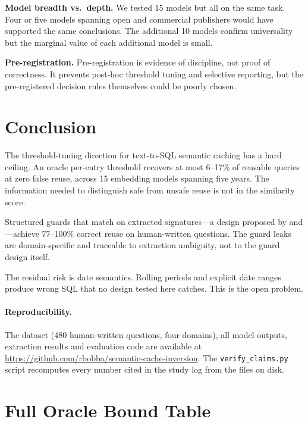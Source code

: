 \documentclass[11pt,a4paper]{article}
\begin{document}
\textbf{Model breadth vs.\ depth.} We tested 15 models but all on the
same task. Four or five models spanning open and commercial publishers
would have supported the same conclusions. The additional 10 models
confirm universality but the marginal value of each additional model is
small.

\textbf{Pre-registration.} Pre-registration is evidence of discipline, not
proof of correctness. It prevents post-hoc threshold tuning and selective
reporting, but the pre-registered decision rules themselves could be poorly
chosen.

\section{Conclusion}

The threshold-tuning direction for text-to-SQL semantic caching has a hard
ceiling. An oracle per-entry threshold recovers at most 6--17\% of
reusable queries at zero false reuse, across 15 embedding models spanning
five years. The information needed to distinguish safe from unsafe reuse is
not in the similarity score.

Structured guards that match on extracted signatures---a design proposed by
\citet{rathore2026cogni} and \citet{bindschaedler2026semantic}---achieve
77--100\% correct reuse on human-written questions. The guard leaks are
domain-specific and traceable to extraction ambiguity, not to the guard
design itself.

The residual risk is date semantics. Rolling periods and explicit date
ranges produce wrong SQL that no design tested here catches. This is the
open problem.

\paragraph{Reproducibility.} The dataset (480 human-written questions,
four domains), all model outputs, extraction results and evaluation code
are available at
\url{https://github.com/rbobba/semantic-cache-inversion}.
The \texttt{verify\_claims.py} script recomputes every number cited in the
study log from the files on disk.




\clearpage
\appendix
\section{Full Oracle Bound Table}
\label{app:oracle}
\end{document}

